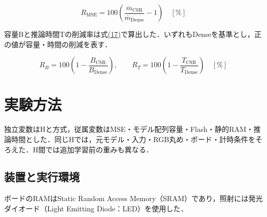 \documentclass[
  10pt,
  a4paper,
]{article}
\begin{document}
\begin{equation}\label{eq:mse-change}
R_{\mathrm{MSE}}=100\left(\frac{\overline m_{\mathrm{CSR}}}{\overline m_{\mathrm{Dense}}}-1\right)\quad[\%]
\end{equation}

容量Bと推論時間Tの削減率は式\hyperref[eq:reductions]{(17)}で算出した．いずれもDenseを基準とし，正の値が容量・時間の削減を表す．

\begin{equation}\label{eq:reductions}
R_B=100\left(1-\frac{B_{\mathrm{CSR}}}{B_{\mathrm{Dense}}}\right),\qquad
R_T=100\left(1-\frac{T_{\mathrm{CSR}}}{T_{\mathrm{Dense}}}\right)\quad[\%]
\end{equation}

\section{実験方法}\label{ux5b9fux9a13ux65b9ux6cd5}

独立変数はHと方式，従属変数はMSE・モデル配列容量・Flash・静的RAM・推論時間とした．同じHでは，元モデル・入力・RGB丸め・ボード・計時条件をそろえた．H間では追加学習前の重みも異なる．

\subsection{装置と実行環境}\label{ux88c5ux7f6eux3068ux5b9fux884cux74b0ux5883}

ボードのRAMはStatic Random Access
Memory（SRAM）であり，照射には発光ダイオード（Light Emitting
Diode：LED）を使用した．
\end{document}
